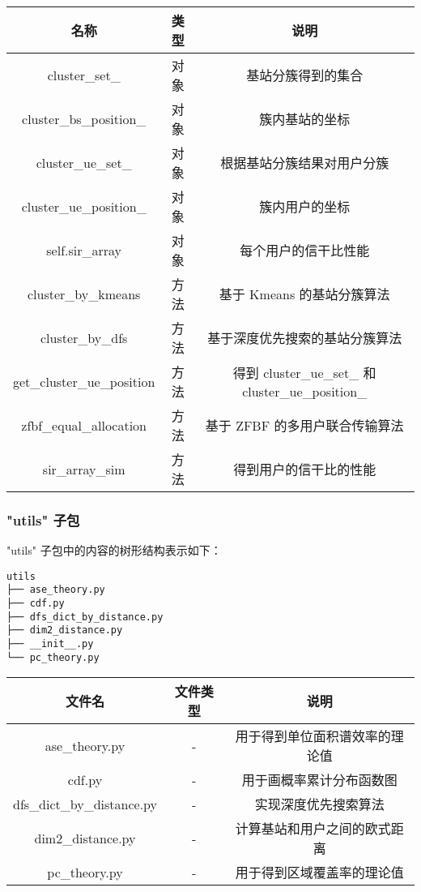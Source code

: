 \documentclass[11pt]{article}
\begin{document}
\begin{longtable}[c]{@{}ccc@{}}
\toprule
名称 & 类型 & 说明\tabularnewline
\midrule
\endhead
cluster\_set\_ & 对象 & 基站分簇得到的集合\tabularnewline
cluster\_bs\_position\_ & 对象 & 簇内基站的坐标\tabularnewline
cluster\_ue\_set\_ & 对象 & 根据基站分簇结果对用户分簇\tabularnewline
cluster\_ue\_position\_ & 对象 & 簇内用户的坐标\tabularnewline
self.sir\_array & 对象 & 每个用户的信干比性能\tabularnewline
cluster\_by\_kmeans & 方法 & 基于 Kmeans 的基站分簇算法\tabularnewline
cluster\_by\_dfs & 方法 & 基于深度优先搜索的基站分簇算法\tabularnewline
get\_cluster\_ue\_position & 方法 & 得到 cluster\_ue\_set\_ 和
cluster\_ue\_position\_\tabularnewline
zfbf\_equal\_allocation & 方法 & 基于 ZFBF
的多用户联合传输算法\tabularnewline
sir\_array\_sim & 方法 & 得到用户的信干比的性能\tabularnewline
\bottomrule
\end{longtable}

    \subsubsection{"utils" 子包}\label{utils-ux5b50ux5305}

"utils" 子包中的内容的树形结构表示如下：

\begin{verbatim}
utils
├── ase_theory.py
├── cdf.py
├── dfs_dict_by_distance.py
├── dim2_distance.py
├── __init__.py
└── pc_theory.py
\end{verbatim}

\begin{longtable}[c]{@{}ccc@{}}
\toprule
文件名 & 文件类型 & 说明\tabularnewline
\midrule
\endhead
ase\_theory.py & - & 用于得到单位面积谱效率的理论值\tabularnewline
cdf.py & - & 用于画概率累计分布函数图\tabularnewline
dfs\_dict\_by\_distance.py & - & 实现深度优先搜索算法\tabularnewline
dim2\_distance.py & - & 计算基站和用户之间的欧式距离\tabularnewline
pc\_theory.py & - & 用于得到区域覆盖率的理论值\tabularnewline
\bottomrule
\end{longtable}


    
    
    
    
\end{document}
